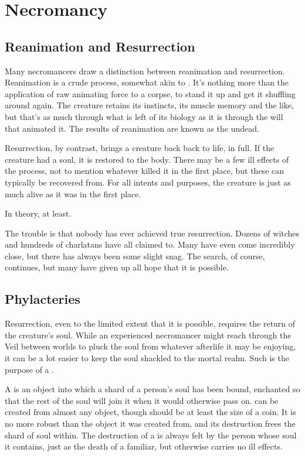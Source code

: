 \chapter{Necromancy}

\section{Reanimation and Resurrection}

Many necromancers draw a distinction between reanimation and resurrection.
Reanimation is a crude process, somewhat akin to .
It's nothing more than the application of raw animating force to a corpse, to stand it up and get it shuffling around again.
The creature retains its instincts, its muscle memory and the like, but that's as much through what is left of its biology as it is through the will that animated it.
The results of reanimation are known as the undead.

Resurrection, by contrast, brings a creature back back to life, in full.
If the creature had a soul, it is restored to the body.
There may be a few ill effects of the process, not to mention whatever killed it in the first place, but these can typically be recovered from.
For all intents and purposes, the creature is just as much alive as it was in the first place.

In theory, at least.

The trouble is that nobody has ever achieved true resurrection.
Dozens of witches and hundreds of charlatans have all claimed to.
Many have even come incredibly close, but there has always been some slight snag.
The search, of course, continues, but many have given up all hope that it is possible.

\section{Phylacteries}

Resurrection, even to the limited extent that it is possible, requires the return of the creature's soul.
While an experienced necromancer might reach through the Veil between worlds to pluck the soul from whatever afterlife it may be enjoying, it can be a lot easier to keep the soul shackled to the mortal realm.
Such is the purpose of a \phylactery.

A \phylactery is an object into which a shard of a person's soul has been bound, enchanted so that the rest of the soul will join it when it would otherwise pass on.
\phylacteries can be created from almost any object, though should be at least the size of a coin.
It is no more robust than the object it was created from, and its destruction frees the shard of soul within.
The destruction of a \phylactery is always felt by the person whose soul it contains, just as the death of a familiar, but otherwise carries no ill effects.

